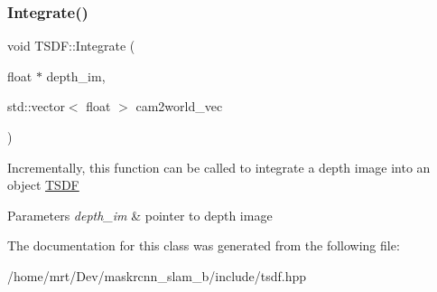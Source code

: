 \subsubsection{\texorpdfstring{Integrate()}{Integrate()}}
{\footnotesize\ttfamily void T\+S\+D\+F\+::\+Integrate (\begin{DoxyParamCaption}\item[{float $\ast$}]{depth\+\_\+im,  }\item[{std\+::vector$<$ float $>$}]{cam2world\+\_\+vec }\end{DoxyParamCaption})}

Incrementally, this function can be called to integrate a depth image into an object \hyperlink{classTSDF}{T\+S\+DF} 
\begin{DoxyParams}{Parameters}
{\em depth\+\_\+im} & pointer to depth image \\
\hline
\end{DoxyParams}


The documentation for this class was generated from the following file\+:\begin{DoxyCompactItemize}
\item 
/home/mrt/\+Dev/maskrcnn\+\_\+slam\+\_\+b/include/tsdf.\+hpp\end{DoxyCompactItemize}
